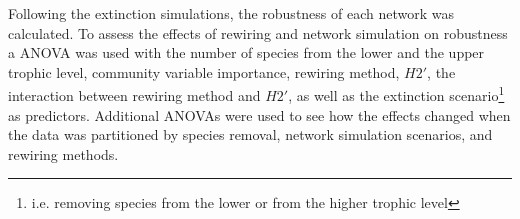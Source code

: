 \documentclass[12pt,a4paper]{article}
\begin{document}


Following the extinction simulations, the robustness of each network was calculated. To assess the effects of rewiring and network simulation on robustness a ANOVA was used with the number of species from the lower and the upper trophic level, community variable importance, rewiring method, $H2'$, the interaction between rewiring method and $H2'$, as well as the extinction scenario\footnote{i.e. removing species from the lower or from the higher trophic level} as predictors. Additional ANOVAs were used to see how the effects changed when the data was partitioned by species removal, network simulation scenarios, and rewiring methods.

 
\end{document}
